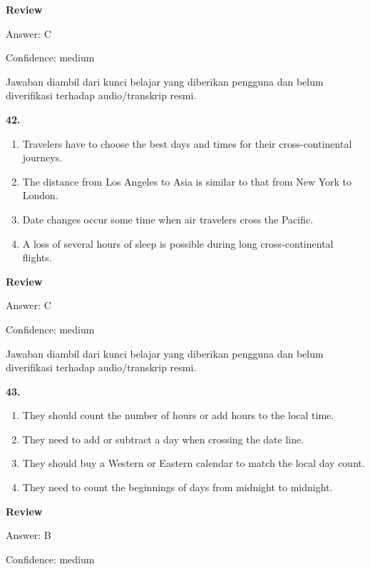 \documentclass[12pt]{article}
\begin{document}
\textbf{Review}\par
Answer: C\par
Confidence: medium\par
Jawaban diambil dari kunci belajar yang diberikan pengguna dan belum diverifikasi terhadap audio/transkrip resmi.\par
\endgroup
\par
\vspace{0.25\baselineskip}
\noindent\textbf{42.}
\begin{enumerate}[label=(\Alph*),leftmargin=*,itemsep=0.2em]
\item Travelers have to choose the best days and times for their cross-continental journeys.
\item The distance from Los Angeles to Asia is similar to that from New York to London.
\item Date changes occur some time when air travelers cross the Pacific.
\item A loss of several hours of sleep is possible during long cross-continental flights.
\end{enumerate}
\par
\begingroup
\setlength{\parskip}{0pt}
\setlength{\parindent}{0pt}
\textbf{Review}\par
Answer: C\par
Confidence: medium\par
Jawaban diambil dari kunci belajar yang diberikan pengguna dan belum diverifikasi terhadap audio/transkrip resmi.\par
\endgroup
\par
\vspace{0.25\baselineskip}
\noindent\textbf{43.}
\begin{enumerate}[label=(\Alph*),leftmargin=*,itemsep=0.2em]
\item They should count the number of hours or add hours to the local time.
\item They need to add or subtract a day when crossing the date line.
\item They should buy a Western or Eastern calendar to match the local day count.
\item They need to count the beginnings of days from midnight to midnight.
\end{enumerate}
\par
\begingroup
\setlength{\parskip}{0pt}
\setlength{\parindent}{0pt}
\textbf{Review}\par
Answer: B\par
Confidence: medium\par
\end{document}
